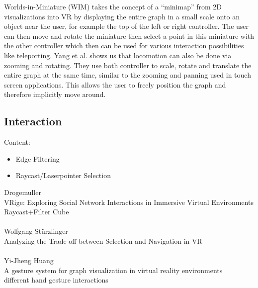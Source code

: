 Worlds-in-Miniature (WIM) \cite{drogemuller_examining_2020} takes the concept of a “minimap” from 2D visualizations into VR by displaying the entire graph in a small scale onto an object near the user, for example the top of the left or right controller. The user can then move and rotate the miniature then select a point in this miniature with the other controller which then can be used for various interaction possibilities like teleporting. Yang et al. \cite{yang_embodied_2020} shows us that locomotion can also be done via zooming and rotating. They use both controller to scale, rotate and translate the entire graph at the same time, similar to the zooming and panning used in touch screen applications. This allows the user to freely position the graph and therefore implicitly move around.

\subsection{Interaction}
Content: 
\begin{itemize}
    \item Edge Filtering
    \item Raycast/Laserpointer Selection
\end{itemize}

Drogemuller\\
VRige: Exploring Social Network Interactions in Immersive Virtual Environments\\
Raycast+Filter Cube\\
\\
Wolfgang Stürzlinger\\
Analyzing the Trade-off between Selection and Navigation in VR\\
\\
Yi-Jheng Huang\\
A gesture system for graph visualization in virtual reality environments\\
different hand gesture interactions\\
\\

